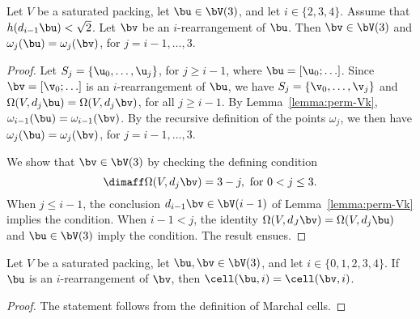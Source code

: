 \begin{lemma}[]\label{lemma:i-omega} %
  Let $V$ be a saturated packing, let $\bu\in \bV(3)$, and let
  $i\in\{2,3,4\}$.  Assume that $h(d_{i-1}\bu)<\sqrt2$.  Let $\bv$ be
  an $i$-rearrangement of $\bu$.  Then $\bv\in \bV(3)$ and
$\omega_j(\bu)=\omega_j(\bv)$,
  for $j=i-1,\ldots,3$.
\end{lemma}

\begin{proof}
Let $S_j =\{\u_0,\ldots,\u_{j}\}$, for $j\ge i-1$, where
  $\bu=[\u_0;\ldots]$.  Since $\bv=[\v_0;\ldots]$ is an
  $i$-rearrangement of $\bu$, we have $S_j =\{\v_0,\ldots,\v_{j}\}$ and
  $\Omega(V,d_j\bu) = \Omega(V,d_j\bv)$,
for all $j\ge i-1$. 
   By Lemma~\ref{lemma:perm-Vk},
  $\omega_{i-1}(\bu) = \omega_{i-1}(\bv)$.  By the recursive
  definition of the points $\omega_j$, we then have
  $\omega_j(\bu)=\omega_j(\bv)$, for $j= i-1,\ldots,3$.

  We show that $\bv\in \bV(3)$ by checking the defining condition
\[
\dimaff \Omega(V,d_j\bv) = 3 - j, \text{ for } 0 < j \le 3.
\]
When $j\le i-1$, the conclusion $d_{i-1}\bv\in \bV(i-1)$ of
Lemma~\ref{lemma:perm-Vk} implies the condition.  When $i-1<j$, the
identity $\Omega(V,d_J\bv)=\Omega(V,d_j\bu)$ and $\bu\in \bV(3)$ imply
the condition.  The result ensues.
\end{proof}

\begin{lemma}[]\label{lemma:marchal-equal} 
Let $V$ be a saturated packing, 
let $\bu,\bv\in \bV(3)$, and let $i\in \{0,1,2,3,4\}$.
If $\bu$ is an $i$-rearrangement of $\bv$, 
then $\cell(\bu,i)=\cell(\bv,i)$.
\end{lemma}

\begin{proof} 
The  statement follows from the definition of Marchal cells.
%
\end{proof}

